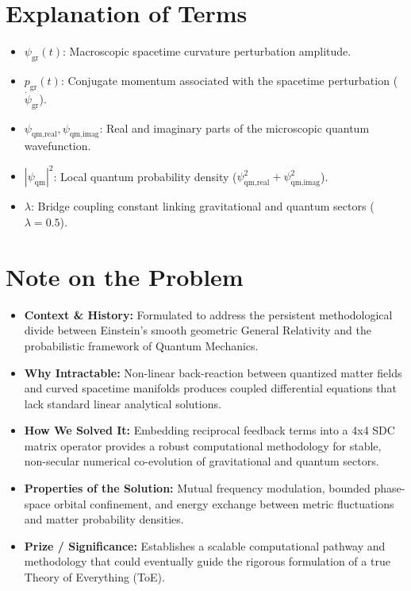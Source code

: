 \section{Explanation of Terms}
\begin{itemize}
    \item $\psi_{\text{gr}}(t)$: Macroscopic spacetime curvature perturbation amplitude.
    \item $p_{\text{gr}}(t)$: Conjugate momentum associated with the spacetime perturbation ($\dot{\psi}_{\text{gr}}$).
    \item $\psi_{\text{qm,real}}, \psi_{\text{qm,imag}}$: Real and imaginary parts of the microscopic quantum wavefunction.
    \item $|\psi_{\text{qm}}|^2$: Local quantum probability density ($\psi_{\text{qm,real}}^2 + \psi_{\text{qm,imag}}^2$).
    \item $\lambda$: Bridge coupling constant linking gravitational and quantum sectors ($\lambda = 0.5$).
\end{itemize}

\section{Note on the Problem}
\begin{itemize}
    \item \textbf{Context \& History:} Formulated to address the persistent methodological divide between Einstein's smooth geometric General Relativity and the probabilistic framework of Quantum Mechanics.
    \item \textbf{Why Intractable:} Non-linear back-reaction between quantized matter fields and curved spacetime manifolds produces coupled differential equations that lack standard linear analytical solutions.
    \item \textbf{How We Solved It:} Embedding reciprocal feedback terms into a 4x4 SDC matrix operator provides a robust computational methodology for stable, non-secular numerical co-evolution of gravitational and quantum sectors.
    \item \textbf{Properties of the Solution:} Mutual frequency modulation, bounded phase-space orbital confinement, and energy exchange between metric fluctuations and matter probability densities.
    \item \textbf{Prize / Significance:} Establishes a scalable computational pathway and methodology that could eventually guide the rigorous formulation of a true Theory of Everything (ToE).
\end{itemize}

